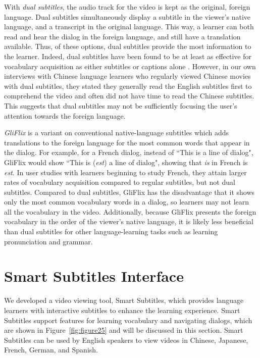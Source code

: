 \documentclass{sigchi}
\begin{document}
With \emph{dual subtitles}, the audio track for the video is kept as the original, foreign language.
Dual subtitles simultaneously display a subtitle in the viewer's native language, and a transcript in the original language. This way, a learner can both read and hear the dialog in the foreign language, and still have a translation
available. Thus, of these options, dual subtitles provide the most information to the learner.
Indeed, dual subtitles have been found to be at least as effective for vocabulary acquisition as
either subtitles or captions alone \cite{raine2012incidental}.
However, in our own interviews with Chinese language learners who regularly viewed Chinese movies
with dual subtitles, they stated they generally read the English subtitles first to comprehend the video and often did not have time to read the Chinese subtitles. This suggests that dual subtitles may not be sufficiently
focusing the user's attention
towards the foreign language.

\emph{GliFlix} \cite{gliflix} is a variant on conventional native-language subtitles which adds translations to the foreign language for the most common words that
appear in the dialog. For example, for a French dialog, instead of ``This is a line of dialog", GliFlix would show ``This is (\emph{est}) a line of dialog", showing that \emph{is} in French is \emph{est}. In user studies with learners beginning to study French, they attain larger rates of vocabulary acquisition compared to regular
subtitles, but not dual subtitles. Compared to dual subtitles, GliFlix has the disadvantage that it shows only the most common vocabulary words in a dialog, so learners may not learn all the vocabulary in the video. Additionally, because GliFlix presents the foreign vocabulary in the order of the viewer's native language, it is likely less beneficial than dual subtitles for
other language-learning tasks such as learning pronunciation and grammar.


\section{Smart Subtitles Interface}

We developed a video viewing tool, Smart Subtitles, which provides language learners with interactive subtitles to enhance the learning experience. Smart Subtitles support features for learning vocabulary and navigating dialogs, which are shown in Figure~\ref{fig:figure25} and will be discussed in this section. Smart Subtitles can be used by English speakers to view videos in Chinese, Japanese, French, German, and Spanish. %
\end{document}
